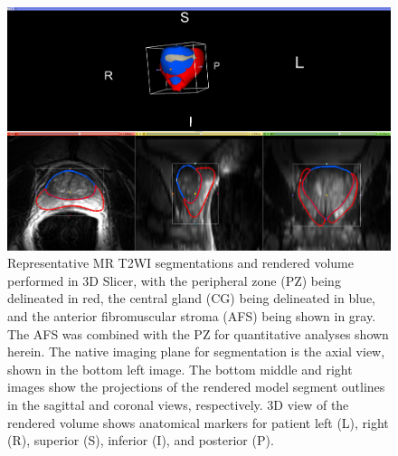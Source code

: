 \begin{figure}
\centering
\includegraphics[width=1.0\textwidth]{tyler/MR_segs_methods.png}
\caption{Representative MR T2WI segmentations and rendered volume performed in
    3D Slicer, with the peripheral zone (PZ) being delineated in red, the
    central gland (CG) being delineated in blue, and the anterior fibromuscular
    stroma (AFS) being shown in gray.  The AFS was combined with the PZ for
    quantitative analyses shown herein.  The native imaging plane for
    segmentation is the axial view, shown in the bottom left image.  The bottom
    middle and right images show the projections of the rendered model segment
    outlines in the sagittal and coronal views, respectively. 3D view of the rendered volume shows anatomical markers for patient left (L), right (R), superior (S), inferior (I), and posterior (P).}
\label{fig:mr_segs_vol} 
\end{figure}
